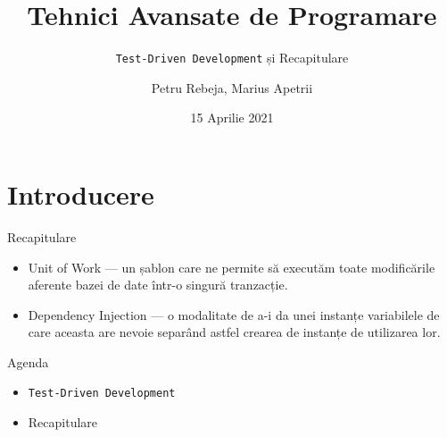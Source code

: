 \documentclass[presentation]{beamer}
\author{Petru Rebeja, Marius Apetrii}
\date{15 Aprilie 2021}
\title{Tehnici Avansate de Programare}
\subtitle{\texttt{Test-Driven Development} și Recapitulare}
\institute[UAIC]{Facultatea de Matematică\\Universitatea Alexandru Ioan Cuza, Iași}
\begin{document}
\maketitle
\section{Introducere}
\label{sec:org04ccc11}
\begin{frame}[label={sec:org92c969e}]{Recapitulare}
\begin{itemize}
\item \alert{Unit of Work} --- un șablon care ne permite să executăm toate modificările aferente bazei de date într-o singură tranzacție.
\item \alert{Dependency Injection} --- o modalitate de a-i da unei instanțe variabilele de care aceasta are nevoie separând astfel crearea de instanțe de utilizarea lor.
\end{itemize}
\end{frame}
\begin{frame}[label={sec:org608c10d},fragile]{Agenda}
 \begin{itemize}
\item \texttt{Test-Driven Development}
\item Recapitulare
\end{itemize}
\end{frame}
\end{document}
